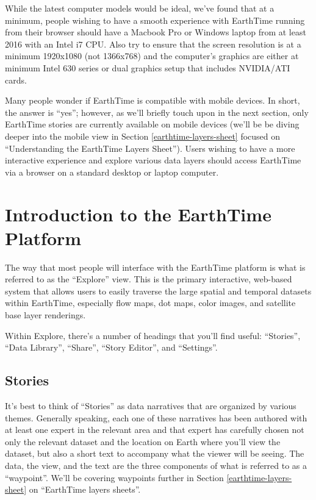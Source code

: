 \documentclass[
]{book}
\begin{document}
While the latest computer models would be ideal, we've found that at a minimum, people wishing to have a smooth experience with EarthTime running from their browser should have a Macbook Pro or Windows laptop from at least 2016 with an Intel i7 CPU. Also try to ensure that the screen resolution is at a minimum 1920x1080 (not 1366x768) and the computer's graphics are either at minimum Intel 630 series or dual graphics setup that includes NVIDIA/ATI cards.

Many people wonder if EarthTime is compatible with mobile devices. In short, the answer is ``yes''; however, as we'll briefly touch upon in the next section, only EarthTime stories are currently available on mobile devices (we'll be be diving deeper into the mobile view in Section \ref{earthtime-layers-sheet} focused on ``Understanding the EarthTime Layers Sheet''). Users wishing to have a more interactive experience and explore various data layers should access EarthTime via a browser on a standard desktop or laptop computer.

\hypertarget{introduction-to-the-earthtime-platform}{%
\section{Introduction to the EarthTime Platform}\label{introduction-to-the-earthtime-platform}}

The way that most people will interface with the EarthTime platform is what is referred to as the ``Explore'' view. This is the primary interactive, web-based system that allows users to easily traverse the large spatial and temporal datasets within EarthTime, especially flow maps, dot maps, color images, and satellite base layer renderings.

Within Explore, there's a number of headings that you'll find useful: ``Stories'', ``Data Library'', ``Share'', ``Story Editor'', and ``Settings''.

\hypertarget{stories}{%
\subsection*{Stories}\label{stories}}


It's best to think of ``Stories'' as data narratives that are organized by various themes. Generally speaking, each one of these narratives has been authored with at least one expert in the relevant area and that expert has carefully chosen not only the relevant dataset and the location on Earth where you'll view the dataset, but also a short text to accompany what the viewer will be seeing. The data, the view, and the text are the three components of what is referred to as a ``waypoint''. We'll be covering waypoints further in Section \ref{earthtime-layers-sheet} on ``EarthTime layers sheets''.
\end{document}
